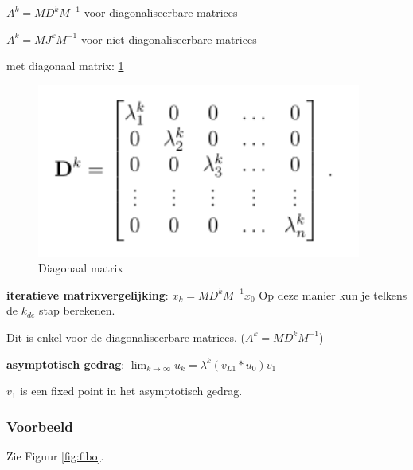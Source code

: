\documentclass[a4paper]{report}
\begin{document}
$A^k = M D^k M^{-1}$ voor diagonaliseerbare matrices

$A^k = M J^k M^{-1}$ voor niet-diagonaliseerbare matrices

met diagonaal matrix: \ref{fig:diag}

\begin{figure}[htbp!]
	\begin{center}
		\includegraphics[width=0.95\textwidth]{./images/diag.png}
	\end{center}
	\caption{Diagonaal matrix}
	\label{fig:diag}
\end{figure}

\textbf{iteratieve matrixvergelijking}: $x_k = M D^k M^{-1} x_0$ Op deze manier kun je telkens de $k_{de}$ stap berekenen.

Dit is enkel voor de diagonaliseerbare matrices. ($A^k = M D^k M^{-1}$)

\textbf{asymptotisch gedrag}: $\lim_{k \to \infty} u_k = \lambda^k (v_{L1} * u_0) v_1$

$v_1$ is een fixed point in het asymptotisch gedrag.

\subsubsection{Voorbeeld}

Zie Figuur \ref{fig:fibo}.
\end{document}
